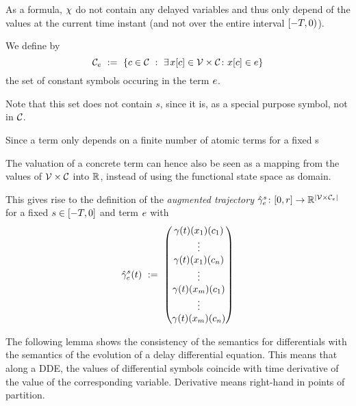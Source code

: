     As a \FOLR formula, $\ivr$ do not contain any delayed variables and thus only depend of the values at the current time instant (and not over the entire interval $\delayinterval$).

    \begin{definition}\label{def:termvars}
        We define by
        \begin{equation*}
            \constants[\astrm] \defeq \set{c\in\constants \with \mexists{\xtau[c]\in\delayvars}\holds\xtau[c]\in\astrm}
        \end{equation*}
        the set of constant symbols occuring in the term $\astrm$.

        Note that this set does not contain $s$, since it is, as a special purpose symbol, not in $\constants$.
    \end{definition}

    \begin{definition}\label{def:aug-trajectory}
        Since a term only depends on a finite number of atomic terms for a fixed s
        
        The valuation of a concrete term can hence also be seen as a mapping from the values of $\delayvars$
        into $\R$, instead of using the functional state space as domain.

        This gives rise to the definition of the \emph{augmented trajectory} $\augtrajectory[s]{\astrm}\from\compactum{0}{r}\to\R^{\abs{\delayvars[\astrm]}}$ for a fixed $s\in\closeddelayinterval$ and term $\astrm$ with
        \begin{equation*}
            \augtrajectory[s]{\astrm}(t) \defeq \colvec{\trajectory(t)(x_1)(c_1)\\ \vdots\\ \trajectory(t)(x_1)(c_n)\\ \vdots\\ \trajectory(t)(x_m)(c_1)\\ \vdots\\ \trajectory(t)(x_m)(c_n)}
        \end{equation*}
    \end{definition}

    The following lemma shows the consistency of the semantics for differentials with the semantics of the evolution of a delay differential equation.
    This means that along a DDE, the values of differential symbols coincide with time derivative of the value of the corresponding variable.
    Derivative means right-hand in points of partition.


